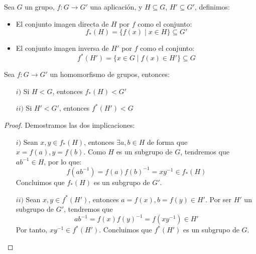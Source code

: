 \begin{definicion}
    Sea $G$ un grupo, $f:G\to G'$ una aplicación, y $H\subseteq G$, $H'\subseteq G'$, definimos:
    \begin{itemize}
        \item El conjunto imagen directa de $H$ por $f$ como el conjunto:
            \begin{equation*}
                f_\ast(H) = \{f(x) \mid x\in H\}\subseteq G'
            \end{equation*}
        \item El conjunto imagen inversa de $H'$ por $f$ como el conjunto:
            \begin{equation*}
                f^\ast(H') = \{x\in G \mid f(x) \in H'\}\subseteq G
            \end{equation*}
    \end{itemize}
\end{definicion}

\begin{prop}\label{prop:imagen_directa}
    Sea $f:G\to G'$ un homomorfismo de grupos, entonces: 
    \begin{enumerate}
        \item[$i)$] Si $H<G$, entonces $f_\ast(H)< G'$ 
        \item[$ii)$] Si $H'<G'$, entonces $f^\ast(H')< G$
    \end{enumerate}
    \begin{proof}
        Demostramos las dos implicaciones:
        \begin{enumerate}
            \item[$i)$] Sean $x,y\in f_\ast(H)$, entonces $\exists a,b\in H$ de forma que $x=f(a), y=f(b)$. Como $H$ es un subgrupo de $G$, tendremos que $ab^{-1}\in H$, por lo que:
            $$f(ab^{-1}) = f(a){f(b)}^{-1} = xy^{-1}\in f_\ast(H)$$
            Concluimos que $f_\ast(H)$ es un subgrupo de $G'$.
            \item[$ii)$] Sean $x,y\in f^\ast(H')$, entonces $a=f(x), b=f(y)\in H'$. Por ser $H'$ un subgrupo de $G'$, tendremos que
            $$ab^{-1} = f(x){f(y)}^{-1}=f(xy^{-1})\in H'$$
            Por tanto, ${xy^{-1}\in f^\ast(H')}$. Concluimos que $f^\ast(H')$ es un subgrupo de $G$.
        \end{enumerate}
    \end{proof}
\end{prop}

